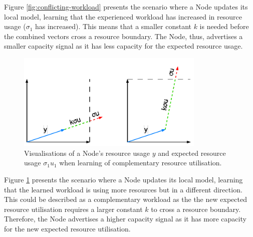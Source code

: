 Figure \ref{fig:conflicting-workload} presents the scenario where a Node updates
its local model, learning that the experienced workload has increased in
resource usage ($\sigma_1$ has increased). This means that a smaller constant
$k$ is needed before the combined vectors cross a resource boundary. The Node,
thus, advertises a smaller capacity signal as it has less capacity for
the expected resource usage.

\begin{figure}[ht]
    \centering
    \includegraphics[width=0.8\textwidth]{images/complementary-workload.pdf}
    \caption{Visualisations of a Node's resource usage $y$ and expected resource
    usage $\sigma_1 u_1$ when learning of complementary resource utilisation.}
    \label{fig:complementary-workload}
\end{figure}

Figure \ref{fig:complementary-workload} presents the scenario where a Node updates
its local model, learning that the learned workload is using more resources but
in a different direction. This could be described as a complementary workload as
the the new expected resource utilisation requires a larger constant $k$ to
cross a resource boundary. Therefore, the Node advertises a higher capacity
signal as it has more capacity for the new expected resource utilisation.

